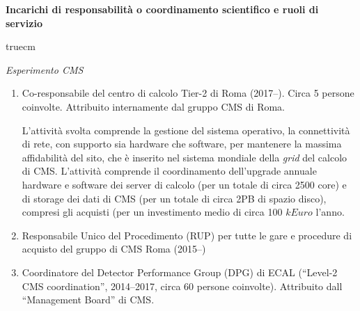 \documentclass[11pt,twoside,a4paper]{article}
\begin{document}
\begin{center}
\textbf{Incarichi di responsabilit\`a o coordinamento scientifico e ruoli di servizio}
\end{center}
 truecm

\textit{Esperimento CMS}
\begin{enumerate}
\item Co-responsabile del centro di calcolo Tier-2 di Roma
  (2017--). Circa 5 persone coinvolte. Attribuito internamente dal
  gruppo CMS di Roma.

  L'attivit\`a svolta comprende la gestione del
  sistema operativo, la connettivit\`a di rete, con supporto sia
  hardware che software, per mantenere la massima affidabilit\`a del
  sito, che \`e inserito nel sistema mondiale della \textit{grid} del
  calcolo di CMS.  L'attivit\`a comprende il coordinamento
  dell'upgrade annuale hardware e software dei server di calcolo (per
  un totale di circa 2500 core) e di storage dei dati di CMS (per un
  totale di circa 2PB di spazio disco), compresi gli acquisti (per un
  investimento medio di circa 100 $kEuro$ l'anno.

\item Responsabile Unico del Procedimento (RUP) per tutte le gare e
  procedure di acquisto del gruppo di CMS Roma (2015--)

\item Coordinatore del Detector Performance Group (DPG) di ECAL
  (``Level-2 CMS coordination'', 2014--2017, circa 60 persone
  coinvolte). Attribuito dall ``Management Board'' di CMS.


\end{enumerate}
\end{document}
